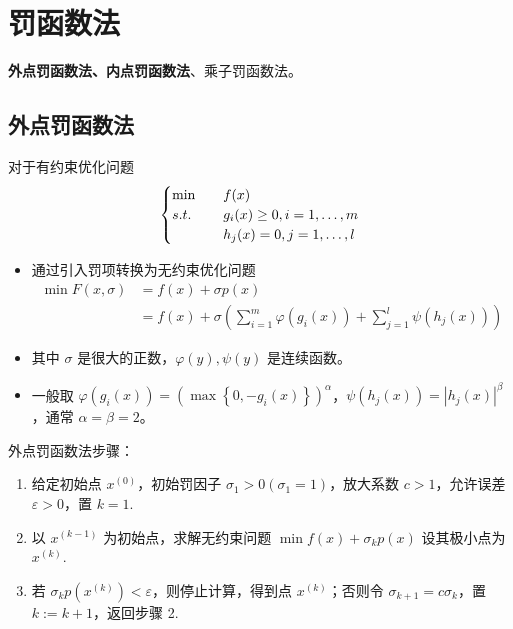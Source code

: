 \section{罚函数法}
\textbf{外点罚函数法、内点罚函数法}、乘子罚函数法。

\subsection{外点罚函数法}
\begin{note}
    对于有约束优化问题 
    \[
        \begin{cases}
            \min \quad &f(x)\\
            s.t. \quad &g_i(x) \ge 0, i = 1, \dots, m\\
            &h_j(x) = 0, j = 1, \dots, l
        \end{cases}
    \]
    \begin{itemize}
        \item 通过引入罚项转换为无约束优化问题 
        \begin{align*}
            \min F(x, \sigma) &= f(x) + \sigma p(x)\\
            &= f(x) + \sigma \left(\sum_{i = 1}^m \varphi(g_i(x)) + \sum_{j = 1}^l \psi(h_j(x))\right)
        \end{align*}
        \item 其中 $\sigma$ 是很大的正数，$\varphi(y), \psi(y)$ 是连续函数。
        \item 一般取 $\varphi(g_i(x)) = \left(\max\left\{0, -g_i(x)\right\}\right)^\alpha$，$\psi(h_j(x)) = |h_j(x)|^\beta$，通常 $\alpha = \beta = 2$。
    \end{itemize}
\end{note}

\begin{note}
    外点罚函数法步骤：
    \begin{enumerate}
        \item 给定初始点 $x^{(0)}$，初始罚因子 $\sigma_1 > 0(\sigma_1 = 1)$，放大系数 $c > 1$，允许误差 $\varepsilon > 0$，置 $k = 1$.
        \item 以 $x^{(k - 1)}$ 为初始点，求解无约束问题 $\min f(x) + \sigma_k p(x)$ 设其极小点为 $x^{(k)}$.
        \item 若 $\sigma_kp(x^{(k)}) < \varepsilon$，则停止计算，得到点 $x^{(k)}$；否则令 $\sigma_{k + 1} = c\sigma_k$，置 $k := k + 1$，返回步骤 2.
    \end{enumerate}
\end{note}

